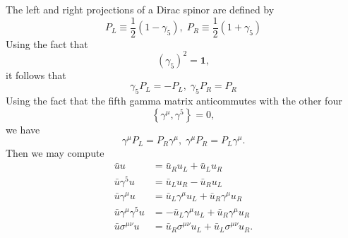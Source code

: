 \documentclass[12pt,letterpaper]{book}
\begin{document}
The left and right projections of a Dirac spinor are defined by
\begin{equation}
P_L\equiv \frac{1}{2}\left(1-\gamma_5\right),\;P_R\equiv \frac{1}{2}\left(1+\gamma_5\right)
\end{equation}
Using the fact that 
\begin{equation}
\left(\gamma_5\right)^2=\mathbf{1},
\end{equation}
it follows that
\begin{equation}
\gamma_5 P_L = -P_L,\;\gamma_5P_R=P_R
\end{equation}
Using the fact that the fifth gamma matrix anticommutes with the other four
\begin{equation}
\left\{\gamma^{\mu},\gamma^5\right\}=0,
\end{equation}
we have
\begin{equation}
\gamma^{\mu}P_L=P_R\gamma^{\mu},\;\gamma^{\mu}P_R=P_L\gamma^{\mu}.
\end{equation}
Then we may compute
\begin{equation}
\begin{split}
\bar{u}u&=\bar{u}_Ru_L+\bar{u}_Lu_R\\
\bar{u}\gamma^5u&=\bar{u}_Lu_R-\bar{u}_Ru_L\\
\bar{u}\gamma^{\mu}u&=\bar{u}_L\gamma^{\mu}u_L+\bar{u}_R\gamma^{\mu}u_R\\
\bar{u}\gamma^{\mu}\gamma^5 u&=-\bar{u}_L\gamma^{\mu}u_L +\bar{u}_R\gamma^{\mu}u_R\\
\bar{u}\sigma^{\mu\nu}u&=\bar{u}_R\sigma^{\mu\nu}u_L+\bar{u}_L\sigma^{\mu\nu}u_R.
\end{split}
\end{equation}
\end{document}
